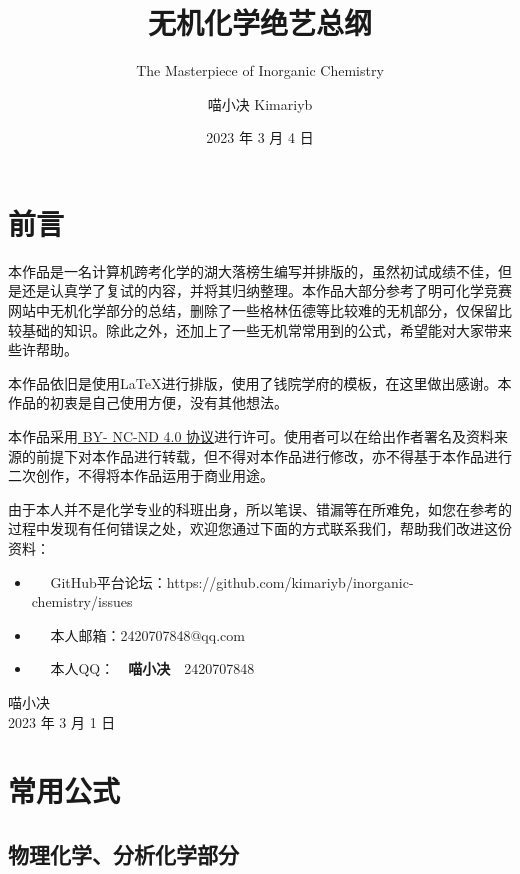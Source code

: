\documentclass[
  10pt,
  twoside,
  openany,
  b5paper, %
  colorscheme = basic, %
  xits = false,
]{qyxf-book}
\title{无机化学绝艺总纲}
\subtitle{The Masterpiece of Inorganic Chemistry}  %
\author{喵小决 Kimariyb}
\date{2023 年 3 月 4 日}
\begin{document}
\maketitle

\chapter*{前言}

本作品是一名计算机跨考化学的湖大落榜生编写并排版的，虽然初试成绩不佳，但是还是认真学了复试的内容，并将其归纳整理。本作品大部分参考了明可化学竞赛网站中无机化学部分的总结，删除了一些格林伍德等比较难的无机部分，仅保留比较基础的知识。除此之外，还加上了一些无机常常用到的公式，希望能对大家带来些许帮助。

本作品依旧是使用\LaTeX 进行排版，使用了钱院学府的模板，在这里做出感谢。本作品的初衷是自己使用方便，没有其他想法。

本作品采用\href{https://
	creativecommons.org/licenses/
	by-nc-nd/4.0/}{ BY-
	NC-ND 4.0 协议}进行许可。使用者可以在给出作者署名及资料来源的前提下对本作品进行转载，但不得对本作品进行修改，亦不得基于本作品进行二次创作，不得将本作品运用于商业用途。

由于本人并不是化学专业的科班出身，所以笔误、错漏等在所难免，如您在参考的过程中发现有任何错误之处，欢迎您通过下面的方式联系我们，帮助我们改进这份资料：
\begin{itemize}
	\item \faGithub ~~ GitHub平台论坛：https://github.com/kimariyb/inorganic-chemistry/issues
	\item \faEnvelopeOpen ~~ 本人邮箱：2420707848@qq.com
	\item \faQq ~~ 
	本人QQ：~~\textbf{喵小决}~~2420707848
\end{itemize}

\begin{flushright}
	喵小决\\
	2023 年 3 月 1 日
\end{flushright}

\clearpage
\tableofcontents


\chapter{常用公式}

\section{物理化学、分析化学部分}
\end{document}
